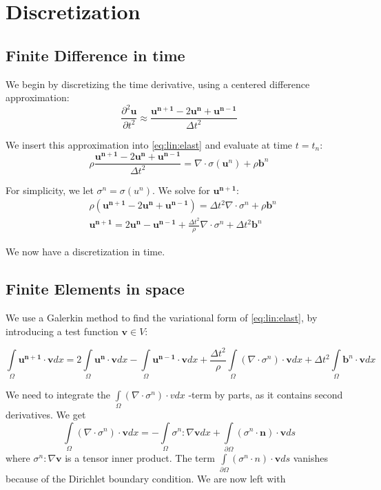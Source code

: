 \documentclass[twoside]{article}
\newcommand{\dutt}{\frac{\partial^2 \mathbf{u}}{\partial t^2}}
\newcommand{\dtt}{\Delta t^2}
\newcommand{\unp}{\mathbf{u^{n+1}}}
\newcommand{\un}{\mathbf{u^{n}}}
\newcommand{\unm}{\mathbf{u^{n-1}}}
\newcommand{\io}{\int\limits_\Omega}
\begin{document}
\section{Discretization}

\subsection{Finite Difference in time}

We begin by discretizing the time derivative, using a centered difference approximation:
\begin{equation}
\dutt  \approx \frac{\unp - 2 \un + \unm}{\dtt}
\end{equation}

We insert this approximation into \eqref{eq:lin:elast} and evaluate at time $t=t_n$:
\begin{equation}
\rho \frac{\unp - 2 \un + \unm}{\dtt} = \nabla\cdot\sigma(\mathbf{u}^n) + \rho \mathbf{b}^n
\end{equation}

For simplicity, we let $\sigma^n = \sigma(u^n)$. We solve for $\unp$:
\begin{align}
&\rho (\unp - 2 \un + \unm) = \dtt \nabla\cdot\sigma^n +  \rho \mathbf{b}^n  \nonumber\\
&\unp = 2 \un - \unm + \frac{\dtt}{\rho} \nabla\cdot\sigma^n + \dtt \mathbf{b}^n
\end{align}

We now have a discretization in time.


\subsection{Finite Elements in space}
We use a Galerkin method to find the variational form of \eqref{eq:lin:elast}, by introducing a test function $\mathbf{v} \in V$:

\begin{equation}
\io \unp \cdot \mathbf{v} dx = 2\io \un \cdot \mathbf{v} dx - \io \unm \cdot \mathbf{v} dx + \frac{\dtt}{\rho} \io (\nabla\cdot\sigma^n) \cdot 
\mathbf{v} dx + \dtt \io \mathbf{b}^n \cdot \mathbf{v} dx
\end{equation}

We need to integrate the $\io (\nabla\cdot\sigma^n) \cdot v dx$ -term by parts, as it contains second derivatives. We get
\begin{equation}
\io (\nabla\cdot\sigma^n) \cdot \mathbf{v} dx = - \io \sigma^n : \nabla \mathbf{v} dx + \int\limits_{\partial\Omega} (\sigma^n\cdot \mathbf{n})\cdot \mathbf{v} ds
\end{equation}
where $\sigma^n : \nabla \mathbf{v}$ is a tensor inner product. The term $\int\limits_{\partial\Omega} (\sigma^n\cdot n)\cdot \mathbf{v} ds$
vanishes because of the Dirichlet boundary condition. We are now left with 
\end{document}
